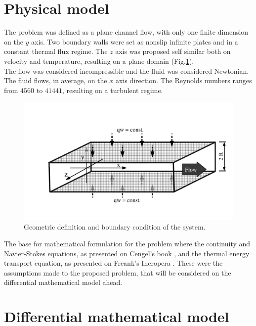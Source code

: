\documentclass[10pt]{article} %
\begin{document}
\section{Physical model}

The problem was defined as a plane channel flow, with only one finite dimension on the $y$ axis. Two boundary walls were set as nonslip infinite plates and in a constant thermal flux regime. The $z$ axis was proposed self similar both on velocity and temperature, resulting on a plane domain (Fig.\ref{figure.1}). \\
The flow was considered incompressible and the fluid was considered Newtonian. The fluid flows, in average, on the $x$ axis direction. 
The Reynolds numbers ranges from $4560$ to $41441$, resulting on a turbulent regime. 

\begin{figure}[h!]
	\centering
	\includegraphics[angle=0, trim={0mm 10mm 0mm 20mm}, clip , scale=0.40]{fotos_formatacao_final/canal1}
	\caption{Geometric definition and boundary condition of the system.}
	\label{figure.1}
\end{figure}

The base for mathematical formulation for the problem where the continuity and Navier-Stokes equations, as presented on Cengel's book \cite{Cengel}, and the thermal energy transport equation, as presented on Freank's Incropera \cite{Incropera}. These were the assumptions made to the proposed problem, that will be considered on the differential mathematical model ahead.









\section{Differential mathematical model}
\end{document}
